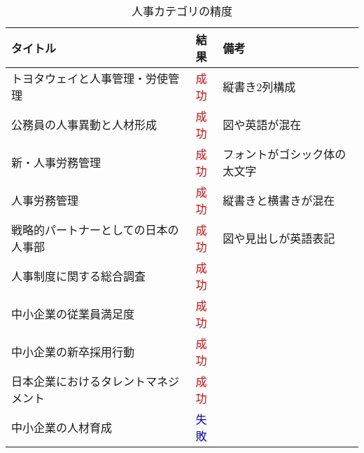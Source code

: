 \begin{table}[h]
  \label{tab:doc_human}
  \begin{center}
  \begin{tabular}{|l|c|l|}
    \hline
    \textbf{タイトル} & \textbf{結果} & \textbf{備考} \\ \hline
    トヨタウェイと人事管理・労使管理 & \textcolor{red}{成功} & 縦書き2列構成 \\ \hline
    公務員の人事異動と人材形成 & \textcolor{red}{成功} & 図や英語が混在 \\ \hline
    新・人事労務管理 & \textcolor{red}{成功} & フォントがゴシック体の太文字 \\ \hline
    人事労務管理 & \textcolor{red}{成功} & 縦書きと横書きが混在 \\ \hline
    戦略的パートナーとしての日本の人事部 & \textcolor{red}{成功} & 図や見出しが英語表記 \\ \hline
    人事制度に関する総合調査 & \textcolor{red}{成功} & \\ \hline
    中小企業の従業員満足度 & \textcolor{red}{成功} & \\ \hline
    中小企業の新卒採用行動 & \textcolor{red}{成功} & \\ \hline
    日本企業におけるタレントマネジメント & \textcolor{red}{成功} & \\ \hline
    中小企業の人材育成 & \textcolor{blue}{失敗} & \\ \hline
  \end{tabular}
  \end{center}
  \caption{人事カテゴリの精度}
\end{table}


